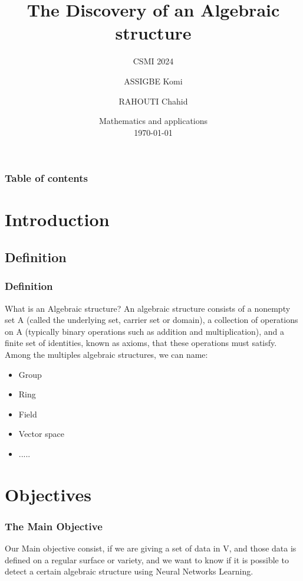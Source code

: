 \documentclass{beamer}
\title{The Discovery of an  Algebraic structure}
\subtitle{CSMI 2024}
\author[ASSIGBE Komi. RAHOUTI Chahid.]{ASSIGBE Komi \and  RAHOUTI Chahid}
\institute[]{University of Strasbourg \\ \smallskip}
\date[\today]{Mathematics and applications \\ \today}
\begin{document}
    \begin{frame}
        \titlepage%
    \end{frame}


    \begin{frame}
        \frametitle{Table of contents}
        \tableofcontents
    \end{frame}

    \section{Introduction}
    \subsection{Definition}
    \begin{frame}
        \frametitle{Definition}
        What is an Algebraic structure? An algebraic structure consists of a nonempty set A (called the underlying set, carrier set or domain), a collection of operations on A (typically binary operations such as addition and multiplication), and a finite set of identities, known as axioms, that these operations must satisfy.
        Among the multiples algebraic structures, we can name:
        \begin{itemize}
            \item Group
            \item Ring
            \item Field
            \item Vector space
            \item .....
        \end{itemize}
    \end{frame}

    \section{Objectives}
    \begin{frame}
        \frametitle{The Main Objective}
        Our Main objective consist,  if we are giving a set of data in V, and those data is defined on a regular surface or variety, and we want to know if it is possible to detect a certain algebraic structure using Neural Networks Learning.
    \end{frame}
\end{document}
